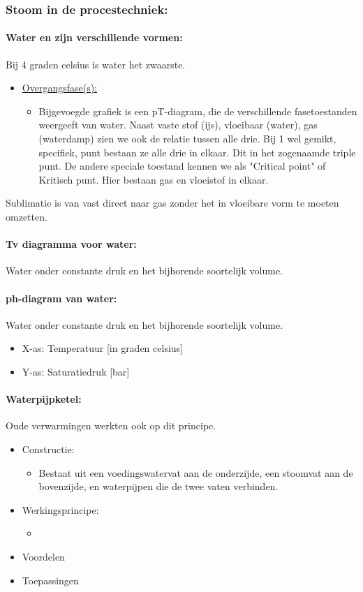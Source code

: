 \documentclass[12pt]{article}
\begin{document}
\subsubsection{Stoom in de procestechniek:}
\paragraph{Water en zijn verschillende vormen:}
Bij 4 graden celsius is water het zwaarste.
\begin{itemize}
    \item \underline{Overgangsfase(s):}\begin{itemize}
        \item Bijgevoegde grafiek is een pT-diagram, die de verschillende fasetoestanden weergeeft van water. Naast vaste stof (ijs), vloeibaar (water), gas (waterdamp) zien we ook de relatie tussen alle drie. Bij 1 wel gemikt, specifiek, punt bestaan ze alle drie in elkaar. Dit in het zogenaamde triple punt. De andere speciale toestand kennen we als "Critical point" of Kritisch punt. Hier bestaan gas en vloeistof in elkaar.
    \end{itemize}
\end{itemize}
Sublimatie is van vast direct naar gas zonder het in vloeibare vorm te moeten omzetten.
\paragraph{Tv diagramma voor water:}
Water onder constante druk en het bijhorende soortelijk volume.
\paragraph{ph-diagram van water:}
Water onder constante druk en het bijhorende soortelijk volume.
\begin{itemize}
    \item X-as: Temperatuur [in graden celsius]
    \item Y-as: Saturatiedruk [bar]
\end{itemize}
\paragraph{Waterpijpketel:}
Oude verwarmingen werkten ook op dit principe.
\begin{itemize}
    \item Constructie: \begin{itemize}
        \item Bestaat uit een voedingswatervat aan de onderzijde, een stoomvat aan de bovenzijde, en waterpijpen die de twee vaten verbinden.
    \end{itemize}
    \item Werkingsprincipe:\begin{itemize}
        \item 
    \end{itemize}
    \item Voordelen
    \item Toepassingen
\end{itemize}
\end{document}
